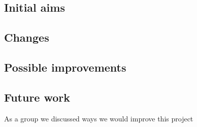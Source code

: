 	\subsection{Initial aims}
	\subsection{Changes}
	\subsection{Possible improvements}
	\subsection{Future work}
		As a group we discussed ways we would improve this project 